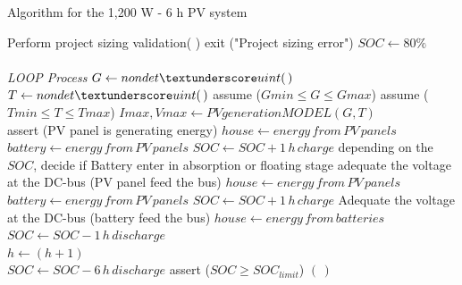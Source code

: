 \documentclass[journal]{IEEEtran}
\begin{document}
 \begin{algorithm}
 \caption{Algorithm for the 1,200 W - 6 h PV system}
 \begin{algorithmic}[1]
 \renewcommand{\algorithmicrequire}{\textbf{Input:}}
 \renewcommand{\algorithmicensure}{\textbf{Output:}}
  \STATE Perform project sizing validation( )
  \STATE exit ("Project sizing error")  
  \ENDIF
  \STATE $SOC \leftarrow 80\%$ \\
 \\ \textit{LOOP Process}
  \STATE $G \leftarrow nondet \textunderscore uint(\,)$ 
  \STATE $T \leftarrow nondet \textunderscore uint(\,)$ 
  \STATE assume ($Gmin \leq G \leq Gmax$) 
  \STATE assume ($Tmin \leq T \leq Tmax$) 
  \STATE $Imax, Vmax \leftarrow PVgenerationMODEL (G,T)$ 
  \\
    \STATE assert (PV panel is generating energy) 
    \STATE $house \leftarrow energy \, from \, PV \, panels$
    \STATE $battery \leftarrow energy \, from \, PV \, panels$ 
    \STATE $SOC \leftarrow SOC + 1\,h\, charge$
  	\STATE depending on the $SOC$, decide if Battery enter in absorption or floating stage
	\STATE adequate the voltage at the DC-bus (PV panel feed the bus)
    \STATE $house \leftarrow energy \, from \, PV \, panels$
    \STATE $battery \leftarrow energy \, from \, PV \, panels$ 
    \STATE $SOC \leftarrow SOC + 1\,h\, charge$
  \ELSE
  	\STATE Adequate the voltage at the DC-bus (battery feed the bus)
	\STATE $house \leftarrow energy \, from \, batteries$
    \STATE $SOC \leftarrow SOC - 1\,h\, discharge$
    \\
  \ENDIF
  \STATE $h \leftarrow (h+1)$
  \ENDFOR
  \\
  \STATE $SOC \leftarrow SOC - 6\,h\, discharge$  
  \STATE assert ($SOC \geq SOC_{limit}$)  
 \RETURN $(\,)$ 
 \end{algorithmic} 
 \end{algorithm}
\end{document}
